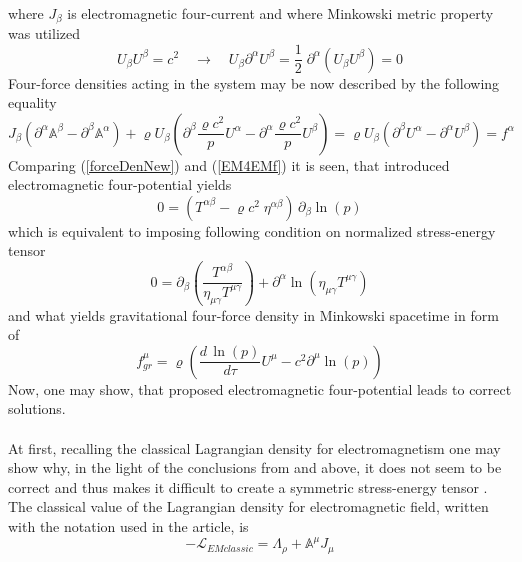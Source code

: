 \documentclass[aps,prx,preprint,groupedaddress,showkeys]{revtex4-2}
\newcommand{\mds}[1] {\frac{d {#1}}{d\tau}}
\begin{document}
where $J_{\beta}$ is electromagnetic four-current and where Minkowski metric property was utilized
\begin{equation} \label{MPR}
U_{\beta}U^{\beta} = c^2 \quad \rightarrow \quad U_{\beta}\partial^{\alpha}U^{\beta}=\frac{1}{2}\;  \partial^{\alpha} \left ( U_{\beta}U^{\beta} \right ) = 0 
\end{equation}
Four-force densities acting in the system may be now described by the following equality
\begin{equation} \label{Equality}
J_{\beta} \left ( \partial^{\alpha}\mathbb{A}^{\beta} - \partial^{\beta}\mathbb{A}^{\alpha} \right ) + \varrho U_{\beta} \left ( \partial^{\beta} \frac{\varrho c^2}{p} U^{\alpha} - \partial^{\alpha}\frac{\varrho c^2}{p} U^{\beta} \right ) = \varrho U_{\beta} \left ( \partial^{\beta} U^{\alpha} - \partial^{\alpha} U^{\beta} \right ) = f^{\alpha}
\end{equation}
Comparing (\ref{forceDenNew}) and (\ref{EM4EMf}) it is seen, that introduced electromagnetic four-potential yields 
\begin{equation} \label{For0tens}
0 = \left ( T^{\alpha \beta} - \varrho c^2 \; \eta^{\alpha \beta} \right ) \, \partial_{\beta} \ln{(p)}
\end{equation}
which is equivalent to imposing following condition on normalized stress-energy tensor
\begin{equation} \label{normCond}
0 = \partial_{\beta} \left ( \frac{T^{\alpha \beta}}{\eta_{\mu \gamma}T^{\mu \gamma}}  \right ) + \partial^{\alpha} \ln{\left ( \eta_{\mu \gamma} T^{\mu \gamma} \right )}
\end{equation}
and what yields gravitational four-force density in Minkowski spacetime in form of
\begin{equation} \label{SIMGR}
f^{\mu}_{gr} = \varrho \left ( \mds{\, \ln{(p)}} U^{\mu} - c^2 \partial^{\mu} \ln{(p)} \right )
\end{equation}
Now, one may show, that proposed electromagnetic four-potential leads to correct solutions.\\
~\\
At first, recalling the classical Lagrangian density \cite{LagDen} for electromagnetism one may show why, in the light of the conclusions from \cite{PMofC} and above, it does not seem to be correct and thus makes it difficult to create a symmetric stress-energy tensor \cite{MEDP}. The classical value of the Lagrangian density for electromagnetic field, written with the notation used in the article, is
\begin{equation} \label{CLASSLAG}
- \mathcal{L}_{EMclassic} = \Lambda_{\rho} + \mathbb{A}^{\mu} J_{\mu}
\end{equation}
\end{document}
